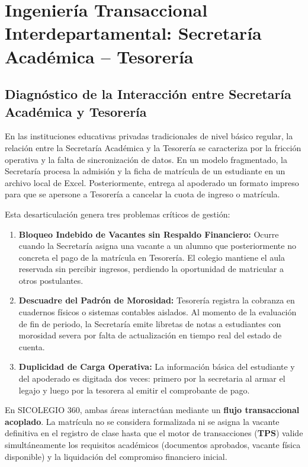 \documentclass[12pt,a4paper,oneside]{report}
\begin{document}
\chapter{Ingeniería Transaccional Interdepartamental: Secretaría Académica -- Tesorería}

\section{Diagnóstico de la Interacción entre Secretaría Académica y Tesorería}

En las instituciones educativas privadas tradicionales de nivel básico regular, la relación entre la Secretaría Académica y la Tesorería se caracteriza por la fricción operativa y la falta de sincronización de datos. En un modelo fragmentado, la Secretaría procesa la admisión y la ficha de matrícula de un estudiante en un archivo local de Excel. Posteriormente, entrega al apoderado un formato impreso para que se apersone a Tesorería a cancelar la cuota de ingreso o matrícula.

Esta desarticulación genera tres problemas críticos de gestión:
\begin{enumerate}
    \item \textbf{Bloqueo Indebido de Vacantes sin Respaldo Financiero:} Ocurre cuando la Secretaría asigna una vacante a un alumno que posteriormente no concreta el pago de la matrícula en Tesorería. El colegio mantiene el aula reservada sin percibir ingresos, perdiendo la oportunidad de matricular a otros postulantes.
    \item \textbf{Descuadre del Padrón de Morosidad:} Tesorería registra la cobranza en cuadernos físicos o sistemas contables aislados. Al momento de la evaluación de fin de periodo, la Secretaría emite libretas de notas a estudiantes con morosidad severa por falta de actualización en tiempo real del estado de cuenta.
    \item \textbf{Duplicidad de Carga Operativa:} La información básica del estudiante y del apoderado es digitada dos veces: primero por la secretaria al armar el legajo y luego por la tesorera al emitir el comprobante de pago.
\end{enumerate}

En SICOLEGIO 360, ambas áreas interactúan mediante un \textbf{flujo transaccional acoplado}. La matrícula no se considera formalizada ni se asigna la vacante definitiva en el registro de clase hasta que el motor de transacciones (\textbf{TPS}) valide simultáneamente los requisitos académicos (documentos aprobados, vacante física disponible) y la liquidación del compromiso financiero inicial.
\end{document}
